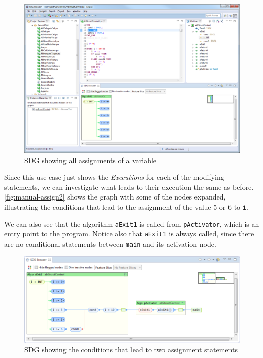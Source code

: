 \begin{figure}[hpb]
  \centering
    \includegraphics[width=\textwidth]{bilder/manual-assign1}
  \caption{SDG showing all assignments of a variable}
  \label{fig:manual-assign1}
\end{figure}

Since this use case just shows the \emph{Executions} for each of the modifying statements, we can investigate what 
leads to their execution the same as before. \autoref{fig:manual-assign2} shows the graph with some of the nodes 
expanded, illustrating the conditions that lead to the assignment of the value 5 or 6 to \lstinline|i|.

We can also see that the algorithm \lstinline|aExit1| is called from \lstinline|pActivator|, which is an entry point to 
the program. Notice also that \lstinline|aExit1| is always called, since there are no conditional statements between 
\lstinline|main| and its activation node.

\begin{figure}[htp]
  \centering
    \includegraphics[width=\textwidth]{bilder/manual-assign2}
  \caption{SDG showing the conditions that lead to two assignment statements}
  \label{fig:manual-assign2}
\end{figure}

